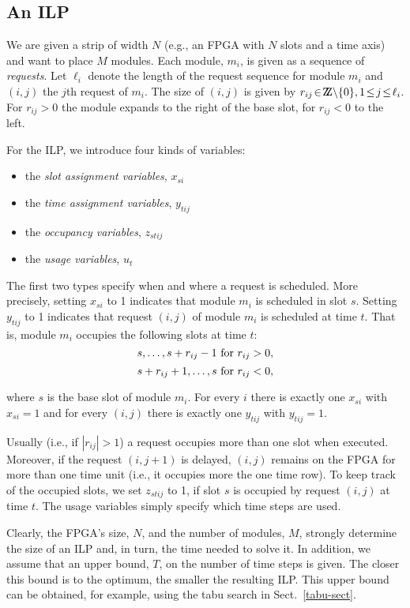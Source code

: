 \documentclass[10pt,journal]{IEEEtran}
\begin{document}
\subsection{An ILP}
We are given a strip of width $N$ 
(e.g., an FPGA with $N$ slots and a time axis) and
want to place $M$ modules.
Each module, $m_i$, is given as a sequence
of {\em requests}.
Let $\ell_i$ denote the length of the request sequence for module $m_i$ and
$(i,j)$ the $j$th request of $m_i$. The size of $(i,j)$ is given by
$r_{ij} \!\in\! \mathrm{Z\kern-.33em Z}\backslash \{0\}, 
1\!\leq\! j\!\leq\! \ell_i$. 
For $r_{ij} > 0$ the module expands to the right of the base slot, 
for $r_{ij} < 0$ to the left.

\smallskip\noindent
For the ILP, we introduce four kinds of variables:
\begin{itemize}
\item the {\em slot assignment variables}, $x_{si}$
\item the {\em time assignment variables}, $y_{tij}$
\item the {\em occupancy variables}, $z_{stij}$
\item the {\em usage variables}, $u_t$
\end{itemize}

The first two types specify when and where a request
is scheduled. More precisely, setting $x_{si}$ to 1 indicates 
that module $m_i$ is scheduled in slot $s$. 
Setting $y_{tij}$ to 1 indicates that 
request $(i,j)$ of module $m_i$ is scheduled at time $t$. That is,
module $m_i$ occupies the following slots at time $t$:
$$s, \ldots, s+r_{ij}-1 \mbox{ \rm for }
r_{ij} > 0,$$
$$s+r_{ij}+1, \ldots, s \mbox{ \rm for }
r_{ij} < 0,$$

\noindent
where $s$ is the base slot of module $m_i$. 
For every 
$i$ there is exactly one $x_{si}$ with $x_{si}=1$ and
for every 
$(i,j)$ there is exactly one $y_{tij}$ with $y_{tij}=1$.

Usually (i.e., if $|r_{ij}| > 1$) a request occupies more than one slot when
executed. Moreover, if the request $(i,j+1)$ is delayed, $(i,j)$ 
remains on the FPGA for more than one time unit
(i.e., it occupies more the one time row).
To keep track of the occupied slots, we set $z_{stij}$ to 1, if 
slot $s$ is occupied by request $(i,j)$ at time $t$.
The usage variables simply specify which
time steps are used. 

Clearly, the FPGA's size, $N$, and the number of modules, $M$, 
strongly determine the size of an ILP and, in turn, the time needed to solve it.
In addition, we assume that an upper bound, $T$, on the number of time steps
is given. The closer this bound is to the optimum, the smaller the 
resulting ILP. This upper bound can be obtained, for example, using
the tabu search in Sect.~\ref{tabu-sect}.\\
\end{document}
